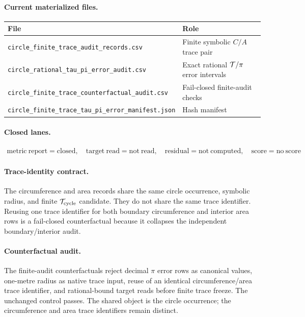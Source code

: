 \paragraph{Current materialized files.}
\begin{center}
\small
\begin{tabular}{ll}
\toprule
File & Role\\
\midrule
\texttt{circle\_finite\_trace\_audit\_records.csv} & Finite symbolic $C/A$ trace pair\\
\texttt{circle\_rational\_tau\_pi\_error\_audit.csv} & Exact rational $\mathcal T/\pi$ error intervals\\
\texttt{circle\_finite\_trace\_counterfactual\_audit.csv} & Fail-closed finite-audit checks\\
\texttt{circle\_finite\_trace\_tau\_pi\_error\_manifest.json} & Hash manifest\\
\bottomrule
\end{tabular}
\end{center}

\paragraph{Closed lanes.}
\[
\boxed{
\begin{array}{c}
\mathrm{metric\ report}=\mathrm{closed},\quad
\mathrm{target\ read}=\mathrm{not\ read},\quad
\mathrm{residual}=\mathrm{not\ computed},\quad
\mathrm{score}=\mathrm{no\ score}
\end{array}
}
\]

\paragraph{Trace-identity contract.}
The circumference and area records share the same circle occurrence, symbolic radius, and finite $\mathcal T_{\mathrm{cycle}}$ candidate.  They do not share the same trace identifier.  Reusing one trace identifier for both boundary circumference and interior area rows is a fail-closed counterfactual because it collapses the independent boundary/interior audit.

\paragraph{Counterfactual audit.}
The finite-audit counterfactuals reject decimal $\pi$ error rows as canonical values, one-metre radius as native trace input, reuse of an identical circumference/area trace identifier, and rational-bound target reads before finite trace freeze.  The unchanged control passes.  The shared object is the circle occurrence; the circumference and area trace identifiers remain distinct.

